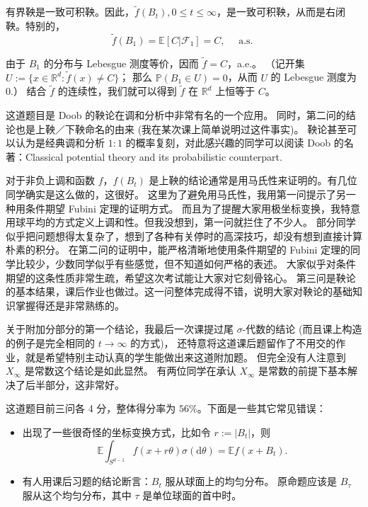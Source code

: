 \begin{enumerate}[label=(\arabic*)]
    有界鞅是一致可积鞅。因此，$\tilde{f}(B_{t}), 0 \leq t \leq \infty$，是一致可积鞅，从而是右闭鞅。特别的，
    $$\tilde{f}(B_{1})=\mathbb{E}[C | \mathscr{F}_{1}]=C, \quad \text{ a.s. } \tag{1}$$

    由于 $B_{1}$ 的分布与 Lebesgue 测度等价，因而 $\tilde{f}=C$，a.e.。
    （记开集 $U:=\{x \in \mathbb{R}^{d}: \tilde{f}(x) \neq C\}$；
    那么 $\mathbb{P}(B_{1} \in U)=0$，从而 $U$ 的 Lebesgue 测度为 $0$.）
    结合 $\tilde{f}$ 的连续性，我们就可以得到 $\tilde{f}$ 在 $\mathbb{R}^{d}$ 上恒等于 $C$。
    \end{enumerate}

    \textcolor{0000cc}{\qquad 这道题目是 Doob 的鞅论在调和分析中非常有名的一个应用。
    同时，第二问的结论也是上鞅／下鞅命名的由来 (我在某次课上简单说明过这件事实)。
    鞅论甚至可以认为是经典调和分析 $1: 1$ 的概率复刻，对此感兴趣的同学可以阅读 Doob 的名著：Classical potential theory and its probabilistic counterpart.

    \qquad 对于非负上调和函数 $f$，$f(B_{t})$ 是上鞅的结论通常是用马氏性来证明的。有几位同学确实是这么做的，这很好。
    这里为了避免用马氏性，我用第一问提示了另一种用条件期望 Fubini 定理的证明方式。
    而且为了提醒大家用极坐标变换，我特意用球平均的方式定义上调和性。但我没想到，第一问就拦住了不少人。
    部分同学似乎把问题想得太复杂了，想到了各种有关停时的高深技巧，却没有想到直接计算朴素的积分。
    在第二问的证明中，能严格清晰地使用条件期望的 Fubini 定理的同学比较少，少数同学似乎有些感觉，但不知道如何严格的表述。
    大家似乎对条件期望的这条性质非常生疏，希望这次考试能让大家对它刻骨铭心。
    第三问是鞅论的基本结果，课后作业也做过。这一问整体完成得不错，说明大家对鞅论的基础知识掌握得还是非常熟练的。

    \qquad 关于附加分部分的第一个结论，我最后一次课提过尾 $\sigma$-代数的结论 (而且课上构造的例子是完全相同的 $t \rightarrow \infty$ 的方式)，
    还特意将这道课后题留作了不用交的作业，就是希望特别主动认真的学生能做出来这道附加题。
    但完全没有人注意到 $X_{\infty}$ 是常数这个结论是如此显然。
    有两位同学在承认 $X_{\infty}$ 是常数的前提下基本解决了后半部分，这非常好。

    \qquad 这道题目前三问各 4 分，整体得分率为 $56 \%$。下面是一些其它常见错误：
    \begin{itemize}
    \item 出现了一些很奇怪的坐标变换方式，比如令 $r:=\left|B_{t}\right|$，则
    $$\mathbb{E} \int_{S^{d-1}} f(x+r \theta) \sigma(\mathrm{d} \theta)
    =\mathbb{E} f(x+B_{t}).$$
    
    \item 有人用课后习题的结论断言：$B_{t}$ 服从球面上的均匀分布。
    原命题应该是 $B_{\tau}$ 服从这个均匀分布，其中 $\tau$ 是单位球面的首中时。
    

\end{itemize}}
